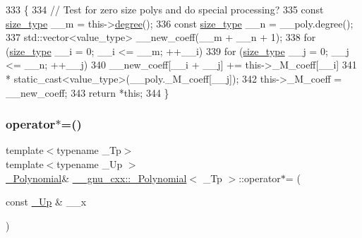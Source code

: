 \begin{DoxyCode}
333       \{
334         \textcolor{comment}{//  Test for zero size polys and do special processing?}
335         \textcolor{keyword}{const} \hyperlink{class____gnu__cxx_1_1__Polynomial_a6afe219c123c7a2fdc5abac8a6639053}{size\_type} \_\_m = this->\hyperlink{class____gnu__cxx_1_1__Polynomial_a07d9933aeeb9afbd823218ed921336cb}{degree}();
336         \textcolor{keyword}{const} \hyperlink{class____gnu__cxx_1_1__Polynomial_a6afe219c123c7a2fdc5abac8a6639053}{size\_type} \_\_n = \_\_poly.degree();
337         std::vector<value\_type> \_\_new\_coeff(\_\_m + \_\_n + 1);
338         \textcolor{keywordflow}{for} (\hyperlink{class____gnu__cxx_1_1__Polynomial_a6afe219c123c7a2fdc5abac8a6639053}{size\_type} \_\_i = 0; \_\_i <= \_\_m; ++\_\_i)
339           \textcolor{keywordflow}{for} (\hyperlink{class____gnu__cxx_1_1__Polynomial_a6afe219c123c7a2fdc5abac8a6639053}{size\_type} \_\_j = 0; \_\_j <= \_\_n; ++\_\_j)
340             \_\_new\_coeff[\_\_i + \_\_j] += this->\_M\_coeff[\_\_i]
341                                 * static\_cast<value\_type>(\_\_poly.\_M\_coeff[\_\_j]);
342         this->\_M\_coeff = \_\_new\_coeff;
343         \textcolor{keywordflow}{return} *\textcolor{keyword}{this};
344       \}
\end{DoxyCode}
\mbox{\label{class____gnu__cxx_1_1__Polynomial_ad5b3128a53c12abe9147832a1a581f6a}} 
\subsubsection{\texorpdfstring{operator$\ast$=()}{operator*=()}\hspace{0.1cm}{\footnotesize\ttfamily [2/3]}}
{\footnotesize\ttfamily template$<$typename \+\_\+\+Tp$>$ \\
template$<$typename \+\_\+\+Up $>$ \\
\hyperlink{class____gnu__cxx_1_1__Polynomial}{\+\_\+\+Polynomial}\& \hyperlink{class____gnu__cxx_1_1__Polynomial}{\+\_\+\+\_\+gnu\+\_\+cxx\+::\+\_\+\+Polynomial}$<$ \+\_\+\+Tp $>$\+::operator$\ast$= (\begin{DoxyParamCaption}\item[{const \hyperlink{class____gnu__cxx_1_1__Polynomial_a242114d4b86648a5dff67a8221f80d40}{\+\_\+\+Up} \&}]{\+\_\+\+\_\+x }\end{DoxyParamCaption})\hspace{0.3cm}{\ttfamily [inline]}}

